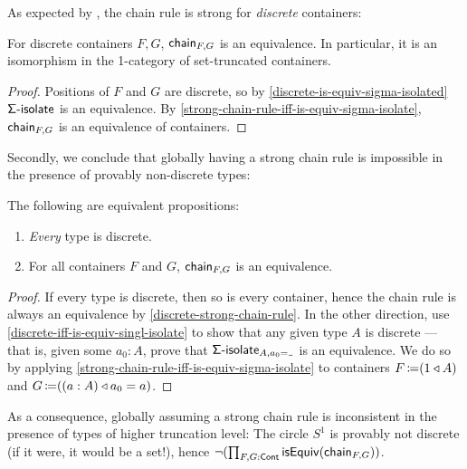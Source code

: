 As expected by \cite[{Proposition~6.6}]{AbbottEtAl2005DataDifferentiating},
the chain rule is strong for \emph{discrete} containers:
\begin{theorem}\label{discrete-strong-chain-rule}
  For discrete containers \( F, G \), \( \operatorname{\mathsf{chain}}_{F,G} \) is an equivalence.
  In particular, it is an isomorphism in the 1-category of set-truncated containers.
  \begin{proof}
    Positions of \( F \) and \( G \) are discrete,
    so by \autoref{discrete-is-equiv-sigma-isolated}
    \( \operatorname{\mathsf{\Sigma-isolate}} \) is an equivalence.
    By \autoref{strong-chain-rule-iff-is-equiv-sigma-isolate}, \( \operatorname{\mathsf{chain}}_{F,G} \) is an equivalence of containers.
  \end{proof}
\end{theorem}

Secondly, we conclude that globally having a strong chain rule is impossible in the presence of provably non-discrete types:
\begin{theorem}\label{globally-discrete-iff-strong-chain-rule}
  The following are equivalent propositions:
  \begin{enumerate}
    \item \emph{Every} type is discrete.
    \item For all containers \( F \) and \( G\), \( \operatorname{\mathsf{chain}}_{F,G} \) is an equivalence.
  \end{enumerate}
  \begin{proof}
    If every type is discrete, then so is every container, hence the chain rule is always an equivalence by \autoref{discrete-strong-chain-rule}.
    In the other direction,
    use \autoref{discrete-iff-is-equiv-singl-isolate} to show that any given type \( A \) is discrete
    ---
    that is, given some \( a_0 : A \), prove that \( \SigmaIsolate_{A, {a_0 = \Blank}} \) is an equivalence.
    We do so by applying \autoref{strong-chain-rule-iff-is-equiv-sigma-isolate} to containers
    \( F \operatorname{\mathrel{\coloneq}} (1\mathbin{\triangleleft}A) \) and \( G \operatorname{\mathrel{\coloneq}} ((a : A)\mathbin{\triangleleft}a_0 = a) \).
  \end{proof}
\end{theorem}

As a consequence, globally assuming a strong chain rule is inconsistent in the presence of types of higher truncation level:
The circle \( S^1 \) is provably not discrete (if it were, it would be a set!),
hence
\(
  \neg ( \prod_{F, G : \operatorname{\mathsf{Cont}}} \mathsf{isEquiv}(\operatorname{\mathsf{chain}}_{F,G}) )
\).

